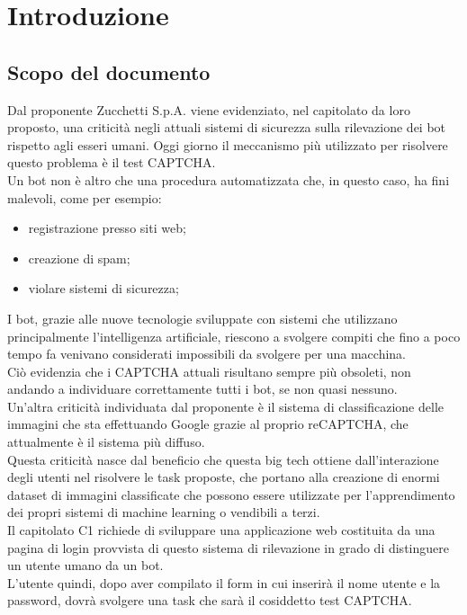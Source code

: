 \section{Introduzione}

\subsection{Scopo del documento}
Dal proponente Zucchetti S.p.A. viene evidenziato, nel capitolato da loro proposto, una criticità negli attuali sistemi di sicurezza sulla rilevazione dei bot rispetto agli esseri umani. Oggi giorno il meccanismo più utilizzato per risolvere questo problema è il test CAPTCHA.\\
Un bot non è altro che una procedura automatizzata che, in questo caso, ha fini malevoli, come per esempio:
\begin{itemize}:
	\item registrazione presso siti web;
	\item creazione di spam;
	\item violare sistemi di sicurezza;
\end{itemize}
I bot, grazie alle nuove tecnologie sviluppate con sistemi che utilizzano principalmente l'intelligenza artificiale, riescono a svolgere compiti che fino a poco tempo fa venivano considerati impossibili da svolgere per una macchina.\\
Ciò evidenzia che i CAPTCHA attuali risultano sempre più obsoleti, non andando a individuare correttamente tutti i bot, se non quasi nessuno.\\
Un'altra criticità individuata dal proponente è il sistema di classificazione delle immagini che sta effettuando Google grazie al proprio reCAPTCHA, che attualmente è il sistema più diffuso.\\
Questa criticità nasce dal beneficio che questa big tech ottiene dall'interazione degli utenti nel risolvere le task proposte, che portano alla creazione di enormi dataset di immagini classificate che possono essere utilizzate per l'apprendimento dei propri sistemi di machine learning o vendibili a terzi.\\
Il capitolato C1 richiede di sviluppare una applicazione web costituita da una pagina di login provvista di questo sistema di rilevazione in grado di distinguere un utente umano da un bot.\\
L'utente quindi, dopo aver compilato il form in cui inserirà il nome utente e la password, dovrà svolgere una task che sarà il cosiddetto test CAPTCHA.

